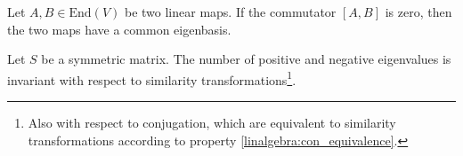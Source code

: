     \begin{property}
        Let $A,B\in\text{End}(V)$ be two linear maps. If the commutator $[A,B]$ is zero, then the two maps have a common eigenbasis.
    \end{property}

    \begin{theorem}
        Let $S$ be a symmetric matrix. The number of positive and negative eigenvalues is invariant with respect to similarity transformations\footnote{Also with respect to conjugation, which are equivalent to similarity transformations according to property \ref{linalgebra:con_equivalence}.}.
    \end{theorem}